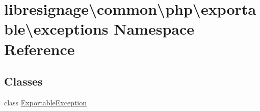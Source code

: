 \hypertarget{namespacelibresignage_1_1common_1_1php_1_1exportable_1_1exceptions}{}\section{libresignage\textbackslash{}common\textbackslash{}php\textbackslash{}exportable\textbackslash{}exceptions Namespace Reference}
\label{namespacelibresignage_1_1common_1_1php_1_1exportable_1_1exceptions}
\subsection*{Classes}
\begin{DoxyCompactItemize}
\item 
class \hyperlink{classlibresignage_1_1common_1_1php_1_1exportable_1_1exceptions_1_1ExportableException}{Exportable\+Exception}
\end{DoxyCompactItemize}
